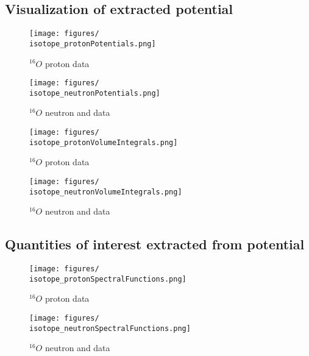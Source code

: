 {    \afterpage{\clearpage}

    \subsection{Visualization of extracted potential}

    \begin{figure}[H]
        \centering
        \begin{minipage}{0.5\textwidth}
            \centering
            \texttt{[image: figures/\\isotope\_protonPotentials.png]}
            \caption{$^{16}O$ proton \rxn data}
        \end{minipage}\hfill
        \begin{minipage}{0.5\textwidth}
            \centering
            \texttt{[image: figures/\\isotope\_neutronPotentials.png]}
            \caption{$^{16}O$ neutron \rxn and \tot data}
        \end{minipage}
    \end{figure}

    \begin{figure}[H]
        \centering
        \begin{minipage}{0.5\textwidth}
            \centering
            \texttt{[image: figures/\\isotope\_protonVolumeIntegrals.png]}
            \caption{$^{16}O$ proton \rxn data}
        \end{minipage}\hfill
        \begin{minipage}{0.5\textwidth}
            \centering
            \texttt{[image: figures/\\isotope\_neutronVolumeIntegrals.png]}
            \caption{$^{16}O$ neutron \rxn and \tot data}
        \end{minipage}
    \end{figure}

    \afterpage{\clearpage}

    \subsection{Quantities of interest extracted from potential}

    \begin{figure}[H]
        \centering
        \begin{minipage}{0.5\textwidth}
            \centering
            \texttt{[image: figures/\\isotope\_protonSpectralFunctions.png]}
            \caption{$^{16}O$ proton \rxn data}
        \end{minipage}\hfill
        \begin{minipage}{0.5\textwidth}
            \centering
            \texttt{[image: figures/\\isotope\_neutronSpectralFunctions.png]}
            \caption{$^{16}O$ neutron \rxn and \tot data}
        \end{minipage}
    \end{figure}

}
